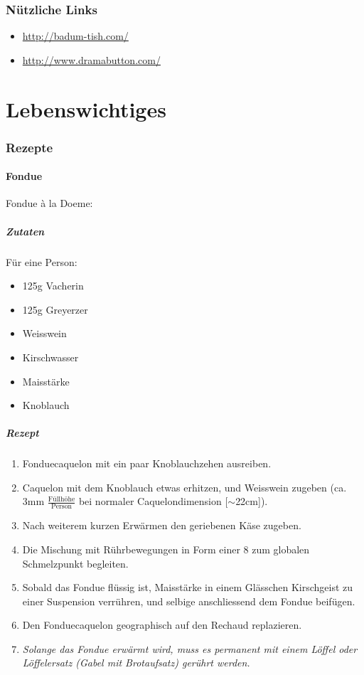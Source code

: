 \documentclass[oneside,12pt,a4paper]{scrartcl}
\newcommand{\linkitem}[1]{\item \url{#1}}
\begin{document}
\section{\glqq Nützliche \grqq Links}
\begin{itemize}
\linkitem{http://badum-tish.com/}
\linkitem{http://www.dramabutton.com/}
\end{itemize}

\part{Lebenswichtiges}
\section{Rezepte}
\subsection{Fondue}
Fondue à la Doeme:

\subsubsection{Zutaten}
Für eine Person:
\begin{itemize}
\item 125g Vacherin
\item 125g Greyerzer
\item Weisswein
\item Kirschwasser
\item Maisstärke
\item Knoblauch
\end{itemize}
\subsubsection{Rezept}

\begin{enumerate}
\item Fonduecaquelon mit ein paar Knoblauchzehen ausreiben.
\item Caquelon mit dem Knoblauch etwas erhitzen, und Weisswein zugeben (ca. 3mm $\frac {\mbox{Füllhöhe}} {\mbox{Person}}$ bei normaler Caquelondimension [$\sim$22cm]).
\item Nach weiterem kurzen Erwärmen den geriebenen Käse zugeben.
\item Die Mischung mit Rührbewegungen in Form einer 8 zum globalen Schmelzpunkt begleiten.
\item Sobald das Fondue flüssig ist, Maisstärke in einem Glässchen Kirschgeist zu einer Suspension verrühren, und selbige anschliessend dem Fondue beifügen.
\item Den Fonduecaquelon geographisch auf den Rechaud replazieren.
\item \emph{Solange das Fondue erwärmt wird, muss es permanent mit einem Löffel oder Löffelersatz (Gabel mit Brotaufsatz) gerührt werden.} 
\end{enumerate}
\end{document}
